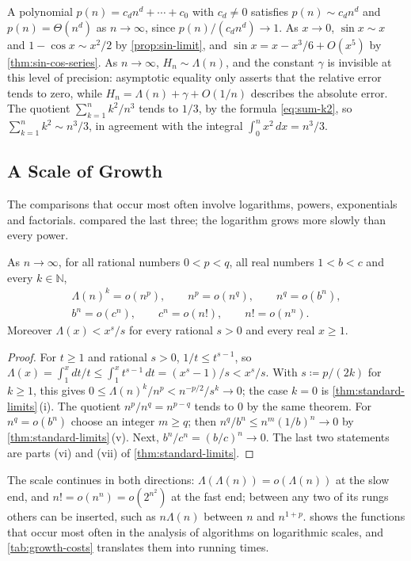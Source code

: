A polynomial $p(n)=c_dn^d+\cdots+c_0$ with $c_d\ne0$ satisfies $p(n)\sim c_dn^d$ and $p(n)=\Theta(n^d)$ as $n\to\infty$, since $p(n)/(c_dn^d)\to1$. As $x\to0$, $\sin x\sim x$ and $1-\cos x\sim x^2/2$ by \cref{prop:sin-limit}, and $\sin x=x-x^3/6+O(x^5)$ by \cref{thm:sin-cos-series}. As $n\to\infty$, $H_n\sim\Lambda(n)$, and the constant $\gamma$ is invisible at this level of precision: asymptotic equality only asserts that the relative error tends to zero, while $H_n=\Lambda(n)+\gamma+O(1/n)$ describes the absolute error. The quotient $\sum_{k=1}^nk^2/n^3$ tends to $1/3$, by the formula \eqref{eq:sum-k2}, so $\sum_{k=1}^nk^2\sim n^3/3$, in agreement with the integral $\int_0^nx^2\,dx=n^3/3$.

\subsection{A Scale of Growth}

The comparisons that occur most often involve logarithms, powers, exponentials and factorials.  compared the last three; the logarithm grows more slowly than every power.

\begin{proposition}
\label{prop:growth-scale}
As $n\to\infty$, for all rational numbers $0<p<q$, all real numbers $1<b<c$ and every $k\in\mathbb N$,
\begin{gather*}
\Lambda(n)^k=o(n^p),\qquad n^p=o(n^q),\qquad n^q=o(b^n),\\
b^n=o(c^n),\qquad c^n=o(n!),\qquad n!=o(n^n).
\end{gather*}
Moreover $\Lambda(x)<x^s/s$ for every rational $s>0$ and every real $x\ge1$.
\end{proposition}

\begin{proof}
For $t\ge1$ and rational $s>0$, $1/t\le t^{s-1}$, so $\Lambda(x)=\int_1^xdt/t\le\int_1^xt^{s-1}\,dt=(x^s-1)/s<x^s/s$. With $s\coloneqq p/(2k)$ for $k\ge1$, this gives $0\le\Lambda(n)^k/n^p<n^{-p/2}/s^k\to0$; the case $k=0$ is \cref{thm:standard-limits}\,(i). The quotient $n^p/n^q=n^{p-q}$ tends to $0$ by the same theorem. For $n^q=o(b^n)$ choose an integer $m\ge q$; then $n^q/b^n\le n^m(1/b)^n\to0$ by \cref{thm:standard-limits}\,(v). Next, $b^n/c^n=(b/c)^n\to0$. The last two statements are parts (vi) and (vii) of \cref{thm:standard-limits}.
\end{proof}

The scale continues in both directions: $\Lambda(\Lambda(n))=o(\Lambda(n))$ at the slow end, and $n!=o(n^n)=o(2^{n^2})$ at the fast end; between any two of its rungs others can be inserted, such as $n\Lambda(n)$ between $n$ and $n^{1+p}$.  shows the functions that occur most often in the analysis of algorithms on logarithmic scales, and \cref{tab:growth-costs} translates them into running times.

